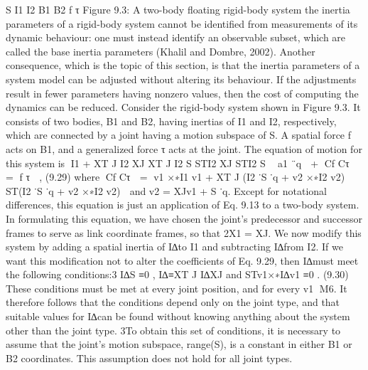 S I1 I2 B1 B2 f τ Figure 9.3: A two-body floating rigid-body system the inertia parameters of a rigid-body system cannot be identified from measurements of its dynamic behaviour: one must instead identify an observable subset, which are called the base inertia parameters (Khalil and Dombre, 2002). Another consequence, which is the topic of this section, is that the inertia parameters of a system model can be adjusted without altering its behaviour. If the adjustments result in fewer parameters having nonzero values, then the cost of computing the dynamics can be reduced. Consider the rigid-body system shown in Figure 9.3. It consists of two bodies, B1 and B2, having inertias of I1 and I2, respectively, which are connected by a joint having a motion subspace of S. A spatial force f acts on B1, and a generalized force τ acts at the joint. The equation of motion for this system is I1 + XT J I2 XJ XT J I2 S STI2 XJ STI2 S  a1 ¨q  + Cf Cτ  = f τ  , (9.29) where Cf Cτ  = v1 ×∗I1 v1 + XT J (I2 ˙S ˙q + v2 ×∗I2 v2) ST(I2 ˙S ˙q + v2 ×∗I2 v2)  and v2 = XJv1 + S ˙q. Except for notational differences, this equation is just an application of Eq. 9.13 to a two-body system. In formulating this equation, we have chosen the joint’s predecessor and successor frames to serve as link coordinate frames, so that 2X1 = XJ. We now modify this system by adding a spatial inertia of I∆to I1 and subtracting I∆from I2. If we want this modification not to alter the coefficients of Eq. 9.29, then I∆must meet the following conditions:3 I∆S ≡0 , I∆≡XT J I∆XJ and STv1×∗I∆v1 ≡0 . (9.30) These conditions must be met at every joint position, and for every v1 ∈M6. It therefore follows that the conditions depend only on the joint type, and that suitable values for I∆can be found without knowing anything about the system other than the joint type. 3To obtain this set of conditions, it is necessary to assume that the joint’s motion subspace, range(S), is a constant in either B1 or B2 coordinates. This assumption does not hold for all joint types.

